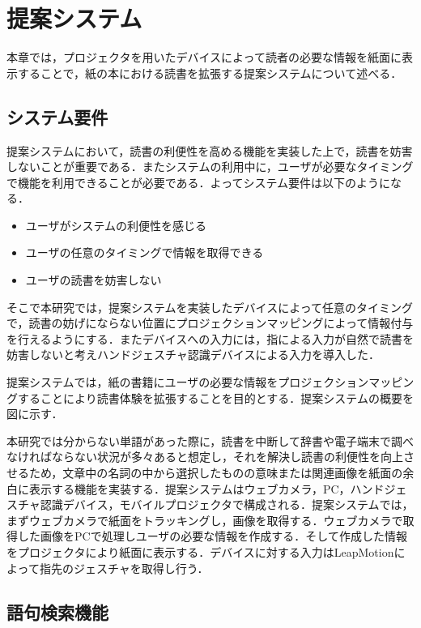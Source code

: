 \section{提案システム}

本章では，プロジェクタを用いたデバイスによって読者の必要な情報を紙面に表示することで，紙の本における読書を拡張する提案システムについて述べる．

\subsection{システム要件}

提案システムにおいて，読書の利便性を高める機能を実装した上で，読書を妨害しないことが重要である．またシステムの利用中に，ユーザが必要なタイミングで機能を利用できることが必要である．よってシステム要件は以下のようになる．

\begin{itemize}
	\item ユーザがシステムの利便性を感じる
	\item ユーザの任意のタイミングで情報を取得できる
	\item ユーザの読書を妨害しない
\end{itemize}

そこで本研究では，提案システムを実装したデバイスによって任意のタイミングで，読書の妨げにならない位置にプロジェクションマッピングによって情報付与を行えるようにする．またデバイスへの入力には，指による入力が自然で読書を妨害しないと考えハンドジェスチャ認識デバイスによる入力を導入した．


提案システムでは，紙の書籍にユーザの必要な情報をプロジェクションマッピングすることにより読書体験を拡張することを目的とする．提案システムの概要を図に示す．


本研究では分からない単語があった際に，読書を中断して辞書や電子端末で調べなければならない状況が多々あると想定し，それを解決し読書の利便性を向上させるため，文章中の名詞の中から選択したものの意味または関連画像を紙面の余白に表示する機能を実装する．提案システムはウェブカメラ，PC，ハンドジェスチャ認識デバイス，モバイルプロジェクタで構成される．提案システムでは，まずウェブカメラで紙面をトラッキングし，画像を取得する．ウェブカメラで取得した画像をPCで処理しユーザの必要な情報を作成する．そして作成した情報をプロジェクタにより紙面に表示する．デバイスに対する入力はLeapMotionによって指先のジェスチャを取得し行う．

\subsection{語句検索機能}


